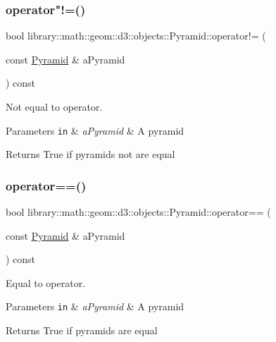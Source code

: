 \subsubsection{\texorpdfstring{operator"!=()}{operator!=()}}
{\footnotesize\ttfamily bool library\+::math\+::geom\+::d3\+::objects\+::\+Pyramid\+::operator!= (\begin{DoxyParamCaption}\item[{const \hyperlink{classlibrary_1_1math_1_1geom_1_1d3_1_1objects_1_1_pyramid}{Pyramid} \&}]{a\+Pyramid }\end{DoxyParamCaption}) const}



Not equal to operator. 


\begin{DoxyParams}[1]{Parameters}
\mbox{\tt in}  & {\em a\+Pyramid} & A pyramid \\
\hline
\end{DoxyParams}
\begin{DoxyReturn}{Returns}
True if pyramids not are equal 
\end{DoxyReturn}
\mbox{\label{classlibrary_1_1math_1_1geom_1_1d3_1_1objects_1_1_pyramid_adfb99bef5bd74a3b0fe75dcf0c61bd61}} 
\subsubsection{\texorpdfstring{operator==()}{operator==()}}
{\footnotesize\ttfamily bool library\+::math\+::geom\+::d3\+::objects\+::\+Pyramid\+::operator== (\begin{DoxyParamCaption}\item[{const \hyperlink{classlibrary_1_1math_1_1geom_1_1d3_1_1objects_1_1_pyramid}{Pyramid} \&}]{a\+Pyramid }\end{DoxyParamCaption}) const}



Equal to operator. 


\begin{DoxyParams}[1]{Parameters}
\mbox{\tt in}  & {\em a\+Pyramid} & A pyramid \\
\hline
\end{DoxyParams}
\begin{DoxyReturn}{Returns}
True if pyramids are equal 
\end{DoxyReturn}
\mbox{\label{classlibrary_1_1math_1_1geom_1_1d3_1_1objects_1_1_pyramid_a150cd331b3dc6e36c74b37bc6988f019}} 
